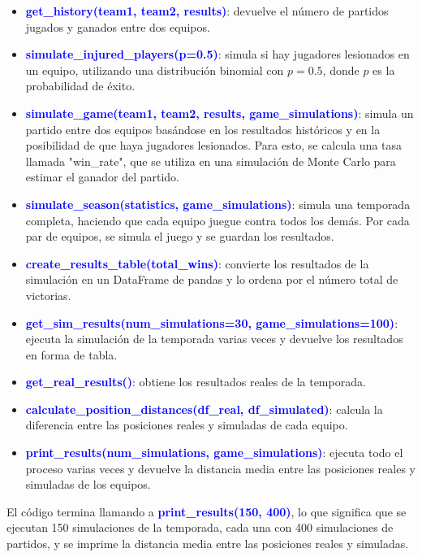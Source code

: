 \documentclass{article}
\begin{document}
        \begin{itemize}
            \item[\checkmark] \textbf{\textcolor{blue}{get\_history(team1, team2, results)}}: devuelve el número de partidos jugados y ganados entre dos equipos.
            \item[\checkmark] \textbf{\textcolor{blue}{simulate\_injured\_players(p=0.5)}}: simula si hay jugadores lesionados en un equipo, utilizando una distribución binomial con $p = 0.5$, donde $p$ es la probabilidad de éxito.
            \item[\checkmark] \textbf{\textcolor{blue}{simulate\_game(team1, team2, results, game\_simulations)}}: simula un partido entre dos equipos basándose en los resultados históricos y en la posibilidad de que haya jugadores lesionados. Para esto, se calcula una tasa llamada "win\_rate", que se utiliza en una simulación de Monte Carlo para estimar el ganador del partido.
            \item[\checkmark] \textbf{\textcolor{blue}{simulate\_season(statistics, game\_simulations)}}: simula una temporada completa, haciendo que cada equipo juegue contra todos los demás. Por cada par de equipos, se simula el juego y se guardan los resultados.
            \item[\checkmark] \textbf{\textcolor{blue}{create\_results\_table(total\_wins)}}: convierte los resultados de la simulación en un DataFrame de pandas y lo ordena por el número total de victorias.
            \item[\checkmark] \textbf{\textcolor{blue}{get\_sim\_results(num\_simulations=30, game\_simulations=100)}}: ejecuta la simulación de la temporada varias veces y devuelve los resultados en forma de tabla.
            \item[\checkmark] \textbf{\textcolor{blue}{get\_real\_results()}}: obtiene los resultados reales de la temporada.
            \item[\checkmark] \textbf{\textcolor{blue}{calculate\_position\_distances(df\_real, df\_simulated)}}: calcula la diferencia entre las posiciones reales y simuladas de cada equipo.
            \item[\checkmark] \textbf{\textcolor{blue}{print\_results(num\_simulations, game\_simulations)}}: ejecuta todo el proceso varias veces y devuelve la distancia media entre las posiciones reales y simuladas de los equipos.
        \end{itemize}

El código termina llamando a \textbf{\textcolor{blue}{print\_results(150, 400)}}, lo que significa que se ejecutan 150 simulaciones de la temporada, cada una con 400 simulaciones de partidos, y se imprime la distancia media entre las posiciones reales y simuladas.
\end{document}
